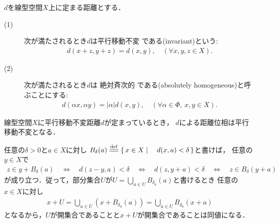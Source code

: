 	\begin{screen}
		\begin{dfn}
			$d$を線型空間$X$上に定まる距離とする．
			\begin{description}
				\item[(1)] 次が満たされるとき$d$は平行移動不変
				である(invariant)という:
					\begin{align}
						d(x+z, y+z) = d(x,y),\quad (\forall x,y,z \in X).
					\end{align}
					
				\item[(2)]  次が満たされるとき$d$は
					絶対斉次的
					である(absolutely homogeneous)と呼ぶことにする:
					\begin{align}
						d(\alpha x, \alpha y) = |\alpha| d(x,y),
						\quad (\forall \alpha \in \Phi,\ x,y \in X).
					\end{align}
			\end{description}
		\end{dfn}
	\end{screen}
	
	\begin{screen}
		\begin{thm}[平行移動不変距離による距離位相は平行移動不変]
			線型空間$X$に平行移動不変距離$d$が定まっているとき，
			$d$による距離位相は平行移動不変となる．
		\end{thm}
	\end{screen}
	
	\begin{prf}
		任意の$\delta>0$と$a \in X$に対し
		$B_\delta(a) \defeq \Set{x \in X}{d(x,a) < \delta}$と書けば，
		任意の$y \in X$で
		\begin{align}
			z \in y + B_\delta(a)
			\quad \Longleftrightarrow \quad
			d(z-y,a) < \delta
			\quad \Longleftrightarrow \quad
			d(z,y+a) < \delta
			\quad \Longleftrightarrow \quad
			z \in B_\delta(y+a)
		\end{align}
		が成り立つ．従って，部分集合$U$が$U = \bigcup_{a \in U}B_{\delta_a}(a)$と書けるとき
		任意の$x \in X$に対し
		\begin{align}
			x + U = \bigcup_{a \in U} \left(x+B_{\delta_a}(a)\right)
			= \bigcup_{a \in U} B_{\delta_a}(x+a)
		\end{align}
		となるから，$U$が開集合であることと$x + U$が開集合であることは同値になる．
		\QED
	\end{prf}
	
